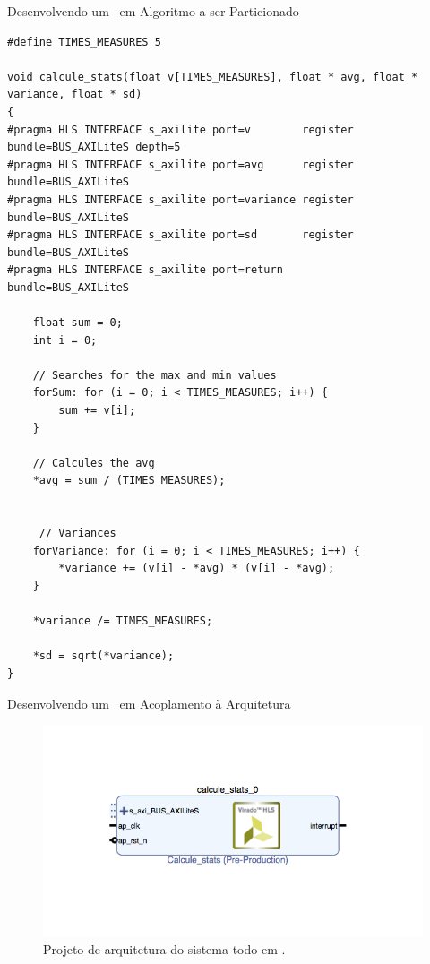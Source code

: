 \begin{frame}{Desenvolvendo um \Wearable\ em \Hardware }{Algoritmo a ser Particionado}
\vspace{-0.6em}
\begin{center}
    \begin{minipage}{10cm}
        \begin{verbatim}
#define TIMES_MEASURES 5

void calcule_stats(float v[TIMES_MEASURES], float * avg, float * variance, float * sd)
{
#pragma HLS INTERFACE s_axilite port=v        register bundle=BUS_AXILiteS depth=5
#pragma HLS INTERFACE s_axilite port=avg      register bundle=BUS_AXILiteS
#pragma HLS INTERFACE s_axilite port=variance register bundle=BUS_AXILiteS
#pragma HLS INTERFACE s_axilite port=sd       register bundle=BUS_AXILiteS
#pragma HLS INTERFACE s_axilite port=return            bundle=BUS_AXILiteS

    float sum = 0;
    int i = 0;

    // Searches for the max and min values
    forSum: for (i = 0; i < TIMES_MEASURES; i++) {
        sum += v[i];
    }

    // Calcules the avg
    *avg = sum / (TIMES_MEASURES);


     // Variances
    forVariance: for (i = 0; i < TIMES_MEASURES; i++) {
        *variance += (v[i] - *avg) * (v[i] - *avg);
    }

    *variance /= TIMES_MEASURES;

    *sd = sqrt(*variance);
}
        \end{verbatim}
    \end{minipage}
\end{center}
\end{frame}


\begin{frame}{Desenvolvendo um \Wearable\ em \Hardware }{Acoplamento à Arquitetura}
\vspace{-0.8em}
\begin{figure}[h] \centering
\includegraphics[width=1\textwidth]{img/vivado_hardware/desligado.png}
\vspace{-1em}
\caption{Projeto de arquitetura do sistema todo em \hardware.}
\end{figure}
\end{frame}

